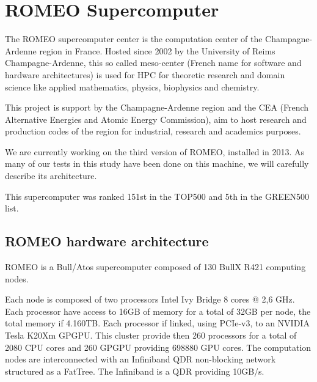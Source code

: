 
\section{ROMEO Supercomputer}

The ROMEO supercomputer center is the computation center of the Champagne-Ardenne region in France. 
Hosted since 2002 by the University of Reims Champagne-Ardenne, this so called meso-center (French name for software and hardware architectures) is used for HPC for theoretic research and domain science like applied mathematics, physics, biophysics and chemistry. 

This project is support by the Champagne-Ardenne region and the CEA (French Alternative Energies and Atomic Energy Commission), aim to host research and production codes of the region for industrial, research and academics purposes. 

We are currently working on the third version of ROMEO, installed in 2013. 
As many of our tests in this study have been done on this machine, we will carefully describe its architecture. 

This supercomputer was ranked 151st in the TOP500 and 5th in the GREEN500 list. 

\subsection{ROMEO hardware architecture}
ROMEO is a Bull/Atos supercomputer composed of 130 BullX R421 computing nodes. 

Each node is composed of two processors Intel Ivy Bridge 8 cores @ 2,6 GHz. 
Each processor have access to 16GB of memory for a total of 32GB per node, the total memory if 4.160TB. 
Each processor if linked, using PCIe-v3, to an NVIDIA Tesla K20Xm GPGPU. 
This cluster provide then 260 processors for a total of 2080 CPU cores and 260 GPGPU providing 698880 GPU cores. 
The computation nodes are interconnected with an Infiniband QDR non-blocking network structured as a FatTree. 
The Infiniband is a QDR providing 10GB/s. 


